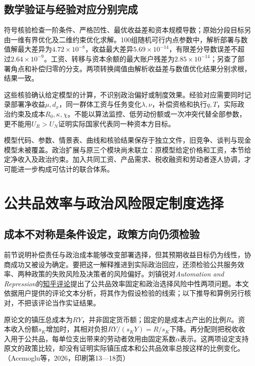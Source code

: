 \documentclass[UTF8,fontset=windows,12pt,a4paper,oneside,openany]{ctexbook}
\begin{document}
\subsection{数学验证与经验对应分别完成}

符号核验检查一阶条件、严格凹性、最优收益差和资本规模导数；原始分段目标另由一维有界优化及二维约束优化求解。100组随机可行内点参数中，解析部署与数值解最大差异为$4.72\times10^{-8}$，收益最大差异$5.69\times10^{-14}$，有限差分导数误差不超过$2.64\times10^{-9}$。工资、转移与资本余额的最大账户残差为$2.85\times10^{-14}$；另查了部署角点和补偿归零的分支。两项转换阈值由解析收益差与数值优化结果分别求根，结果一致。

这些核验确认给定模型的计算，不识别政治偏好或制度效果。经验对应需要同时记录部署净收益$\mu,d_x$，同一群体工资与任务变化$\lambda,\nu$，补偿资格和执行$q,T$，实际政治约束及成本$R_0,\kappa,\chi$。不能以算法监控、低劳动份额或一次冲突代替全部参数，更不能用$U_R>U_N$证明实际国家代表同一种资本方目标。

模型代码、参数、情景表、曲线和核验结果保存于独立文件，旧竞争、谈判与现金模型未被覆盖。政治扩展与原三个模块尚未联立：原模型给定价格和工资，本节给定净收入及政治约束。加入共同工资、产品需求、税收融资和劳动者逐人协调，才可能进一步构成可估计的联合体系。

\section{公共品效率与政治风险限定制度选择}\label{sec:political-robustness}

\subsection{成本不对称是条件设定，政策方向仍须检验}

前节说明补偿责任与政治成本能够改变部署选择，但其预期收益目标仍为线性，协商成功又被设为确定。要把这一解释推进到实际政治回应，还须检验公共服务效率、两种政策的失败风险及决策者的风险偏好。刘镇锐对\emph{Automation and Repression}的\href{https://www.zhihu.com/question/2083147887706366153/answer/2088453310651032052}{知乎评论}提出了公共品效率固定和政治选择风险中性两项问题。本文依据用户提供的评论文本分析，将其作为假设检验的线索；以下推导和算例另行核对，不把该评论当作实证结果。

原论文的镇压总成本为$RY$，并非固定货币额；固定的是成本占产出的比例$R$。资本收入份额$s_K$增加时，其相对负担$RY/(s_KY)=R/s_K$下降。再分配则把税收收入用于公共品，每单位支出带来的劳动者效用由固定系数$\alpha$表示。这两项设定支持原文的政策比较，却没有证明实际镇压成本和公共品效率总按这样的比例变化。（Acemoglu等，2026，印刷第13—18页）
\end{document}
